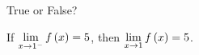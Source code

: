 \documentclass{ximera}
\author{Gregory Hartman \and Matthew Carr}
\begin{document}
\begin{exercise}



True or False?
\begin{center}
If $\lim_{x\to1^{-}}f\p{x}=5$, then $\lim_{x\to1}f\p{x}=5$.
\end{center}

\begin{prompt}
\begin{multipleChoice}
\end{multipleChoice}
\end{prompt}

\end{exercise}
\end{document}
